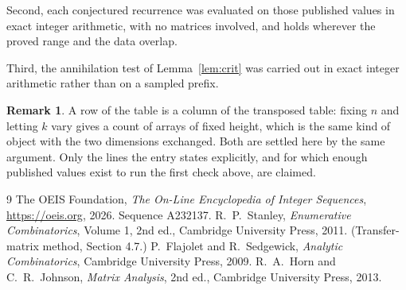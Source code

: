 \documentclass[11pt,a4paper]{article}
\theoremstyle{plain}
\theoremstyle{definition}
\newtheorem{remark}[theorem]{Remark}
\begin{document}
Second, each conjectured recurrence was evaluated on those published values in exact
integer arithmetic, with no matrices involved, and holds wherever the proved range and the
data overlap.

Third, the annihilation test of Lemma~\ref{lem:crit} was carried out in exact integer
arithmetic rather than on a sampled prefix.

\begin{remark}
A row of the table is a column of the transposed table: fixing $n$ and letting $k$ vary gives a
count of arrays of fixed height, which is the same kind of object with the two dimensions
exchanged. Both are settled here by the same argument. Only the lines the entry states
explicitly, and for which enough published values exist to run the first check above, are
claimed.
\end{remark}

\begin{thebibliography}{9}
 The OEIS Foundation, \emph{The On-Line Encyclopedia of Integer
Sequences}, \url{https://oeis.org}, 2026. Sequence A232137.
 R.~P.~Stanley, \emph{Enumerative Combinatorics}, Volume 1, 2nd ed.,
Cambridge University Press, 2011. (Transfer-matrix method, Section 4.7.)
 P.~Flajolet and R.~Sedgewick, \emph{Analytic Combinatorics}, Cambridge
University Press, 2009.
 R.~A.~Horn and C.~R.~Johnson, \emph{Matrix Analysis}, 2nd ed., Cambridge
University Press, 2013.
\end{thebibliography}
\end{document}
